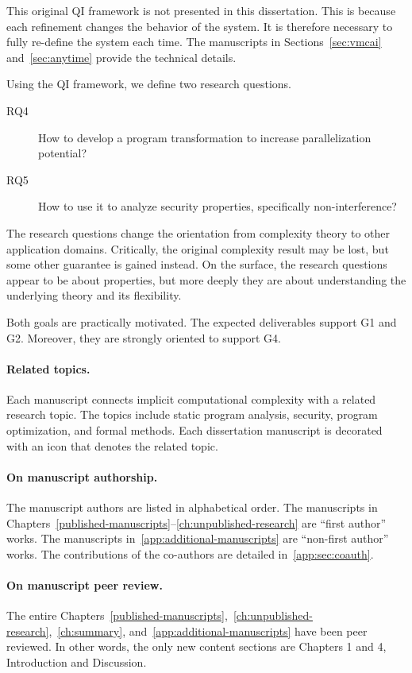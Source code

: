 This original QI framework is not presented in this dissertation. This is
because each refinement changes the behavior of the system. It is therefore
necessary to fully re-define the system each time. The manuscripts in
Sections~\ref{sec:vmcai} and~\ref{sec:anytime} provide the technical details.

Using the QI framework, we define two research questions.
\begin{description}
\item[RQ4] How to develop a program transformation to increase parallelization
potential?
\item[RQ5] How to use it to analyze security properties, specifically
non-interference?
\end{description}

The research questions change the orientation from complexity theory to other
application domains. Critically, the original complexity result may be lost, but
some other guarantee is gained instead. On the surface, the research questions
appear to be about properties, but more deeply they are about understanding the
underlying theory and its flexibility.

Both goals are practically motivated. The expected deliverables support G1 and
G2. Moreover, they are strongly oriented to support G4.

\paragraph*{Related topics.}
Each manuscript connects implicit computational complexity with a related research topic.
The topics include static program analysis, security, program optimization, and formal methods.
Each dissertation manuscript is decorated with an icon that denotes the related topic.

\paragraph*{On manuscript authorship.}
The manuscript authors are listed in alphabetical order.
The manuscripts in Chapters~\autoref{published-manuscripts}--\autoref{ch:unpublished-research} are \enquote{first author} works.
The manuscripts in~\autoref{app:additional-manuscripts} are \enquote{non-first author} works.
The contributions of the co-authors are detailed in~\autoref{app:sec:coauth}.

\paragraph*{On manuscript peer review.}
The entire Chapters~\ref{published-manuscripts},~\ref{ch:unpublished-research},~\ref{ch:summary}, and~\ref{app:additional-manuscripts} have been peer reviewed.
In other words, the only new content sections are Chapters 1 and 4, Introduction and Discussion.

